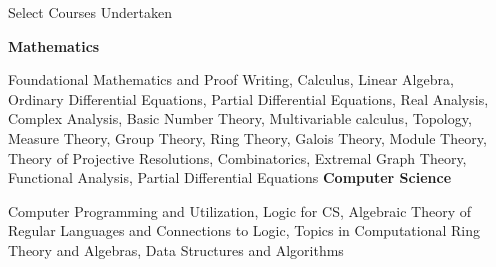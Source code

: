 \begin{rubric}{Select Courses Undertaken}

\entry*[]\textbf{Mathematics} 

Foundational Mathematics and Proof Writing, Calculus, Linear Algebra, Ordinary Differential Equations, Partial Differential Equations, Real Analysis, Complex Analysis, Basic Number Theory, Multivariable calculus, Topology, Measure Theory, Group Theory, Ring Theory, Galois Theory, Module Theory, Theory of Projective Resolutions, Combinatorics, Extremal Graph Theory, Functional Analysis, Partial Differential Equations
%
\entry*[] \textbf{Computer Science} 

Computer Programming and Utilization, Logic for CS, Algebraic Theory of Regular Languages and Connections to Logic, Topics in Computational Ring Theory and Algebras, Data Structures and Algorithms
\end{rubric}